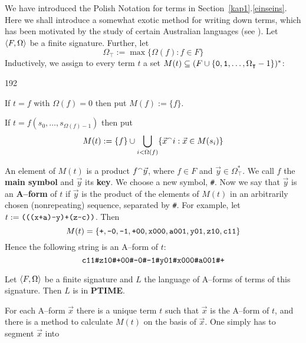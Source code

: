 We have introduced the Polish Notation for terms in
Section~\ref{kap1}.\ref{einseins}. Here we shall introduce a somewhat
exotic method for writing down terms, which has been motivated
by the study of certain Australian languages (see \cite{ebertkracht}). 
Let $\langle F, \Omega\rangle$ be a finite signature. Further, let 
\index{$\Omega_{\intercal}$}%
\begin{equation}
\Omega_{\intercal} := \max \{\Omega(f) : f \in F\}
\end{equation}
Inductively, we assign to every term $t$ a set 
$M(t) \subseteq (F \cup \{\mbox{\tt 0},
\mbox{\tt 1},\dotsc,\Omega_{\intercal} - 1\})^{\ast}$:
\begin{dingautolist}{192}
\item If $t = f$ with $\Omega(f) = 0$ then put $M(f) := \{f\}$.
\item If $t = f(s_0, \dotsc, s_{\Omega(f)-1})$ then put
    \begin{equation*}
     M(t) := \{f\} \cup \bigcup_{i < \Omega(f)}
        \{\vec{x}{^{\smallfrown}} i : \vec{x} \in M(s_i)\}
    \end{equation*}
\end{dingautolist}
An element of $M(t)$ is a product $f {^{\smallfrown}} \vec{y}$,
where $f \in F$ and $\vec{y}\in \Omega_{\intercal}^{\ast}$. We call
$f$ the {\bf main symbol} and $\vec{y}$ its {\bf key}.
We choose a new symbol, {\tt \#}. 
Now we say that $\vec{y}$ is an {\bf A--form} of $t$ if $\vec{y}$
is the product of the elements of $M(t)$ in an arbitrarily chosen
(nonrepeating) sequence, separated by {\tt \#}. For example, 
let $t := \mbox{\tt (((x+a)-y)+(z-c))}$. Then
\begin{equation}
M(t) = \{\mbox{\tt +}, \mbox{\tt -0}, \mbox{\tt -1},
\mbox{\tt +00}, \mbox{\tt x000}, \mbox{\tt a001},
\mbox{\tt y01}, \mbox{\tt z10}, \mbox{\tt c11}\}
\end{equation}
Hence the following string is an A--form of $t$:
\begin{equation}
\mbox{\tt c11\#z10\#+00\#-0\#-1\#y01\#x000\#a001\#+}
\end{equation}
\begin{thm}
Let $\langle F, \Omega\rangle$ be a finite signature and
$L$ the language of A--forms of terms of this signature.
Then $L$ is in \textbf{PTIME}.
\end{thm}
\proofbeg 
For each A--form $\vec{x}$ there is a unique term $t$ such that 
$\vec{x}$ is the A--form of $t$, and there is a method to calculate 
$M(t)$ on the basis of $\vec{x}$. One simply has to segment $\vec{x}$ into 
